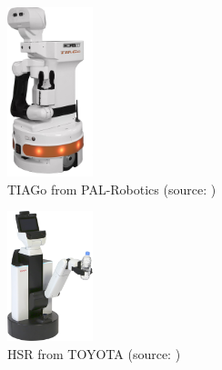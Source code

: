 \begin{figure}[h]
  \centering
  \includegraphics[width=25mm]{images/png/TIAGo.png}
  \caption[TIAGo from PAL-Robotics]{TIAGo from PAL-Robotics (source: \cite{TIAGo:online})}
  \label{fig:TIAGo}
\end{figure}
\begin{figure}[h]
  \centering
  \includegraphics[width=25mm]{images/png/HSR.png}
  \caption[HSR from TOYOTA]{HSR from TOYOTA (source: \cite{HSR:online})}
  \label{fig:HSR}
\end{figure}

\newpage